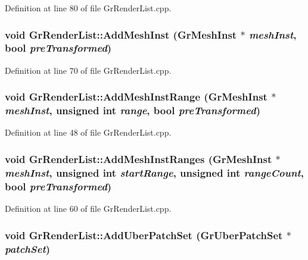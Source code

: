 Definition at line 80 of file GrRenderList.cpp.\hypertarget{class_gr_render_list_2092d2e20fd57bb03c5090684201530c}{
\subsubsection[{AddMeshInst}]{\setlength{\rightskip}{0pt plus 5cm}void GrRenderList::AddMeshInst ({\bf GrMeshInst} $\ast$ {\em meshInst}, \/  bool {\em preTransformed})}}
\label{class_gr_render_list_2092d2e20fd57bb03c5090684201530c}




Definition at line 70 of file GrRenderList.cpp.\hypertarget{class_gr_render_list_7f49dae7c01019fc472c1a6eb4c0c7f2}{
\subsubsection[{AddMeshInstRange}]{\setlength{\rightskip}{0pt plus 5cm}void GrRenderList::AddMeshInstRange ({\bf GrMeshInst} $\ast$ {\em meshInst}, \/  unsigned int {\em range}, \/  bool {\em preTransformed})}}
\label{class_gr_render_list_7f49dae7c01019fc472c1a6eb4c0c7f2}




Definition at line 48 of file GrRenderList.cpp.\hypertarget{class_gr_render_list_be7569ef61ce1cc020a454da4bcf3c41}{
\subsubsection[{AddMeshInstRanges}]{\setlength{\rightskip}{0pt plus 5cm}void GrRenderList::AddMeshInstRanges ({\bf GrMeshInst} $\ast$ {\em meshInst}, \/  unsigned int {\em startRange}, \/  unsigned int {\em rangeCount}, \/  bool {\em preTransformed})}}
\label{class_gr_render_list_be7569ef61ce1cc020a454da4bcf3c41}




Definition at line 60 of file GrRenderList.cpp.\hypertarget{class_gr_render_list_43ea9830b9dfd7e1d71f94145016ccd8}{
\subsubsection[{AddUberPatchSet}]{\setlength{\rightskip}{0pt plus 5cm}void GrRenderList::AddUberPatchSet ({\bf GrUberPatchSet} $\ast$ {\em patchSet})}}
\label{class_gr_render_list_43ea9830b9dfd7e1d71f94145016ccd8}




